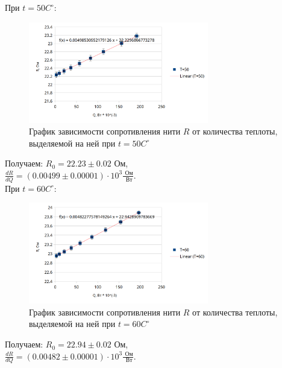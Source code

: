 \documentclass[a4paper]{article}
\begin{document}
При $t = 50C^\circ$:
\begin{figure}[ht]
    \centering
    \includegraphics[width=0.7\textwidth]{charts_R_Q/T_50.png}
    \caption{График зависимости сопротивления нити $R$ от количества теплоты, выделяемой на ней при $t = 50C^\circ$}
\end{figure}

\newpage

Получаем:
$R_0 = 22.23 \pm 0.02\text{ Ом}$,\\

$\frac{dR}{dQ} = (0.00499 \pm 0.00001) \cdot 10^3 \frac{\text{ Ом}}{\text{ Вт}}$. \\


При $t = 60C^\circ$:
\begin{figure}[ht]
    \centering
    \includegraphics[width=0.7\textwidth]{charts_R_Q/T_60.png}
    \caption{График зависимости сопротивления нити $R$ от количества теплоты, выделяемой на ней при $t = 60C^\circ$}
\end{figure}

Получаем:
$R_0 = 22.94 \pm 0.02\text{ Ом}$,\\

$\frac{dR}{dQ} = (0.00482 \pm 0.00001) \cdot 10^3 \frac{\text{ Ом}}{\text{ Вт}}$. \\

\newpage
\end{document}
